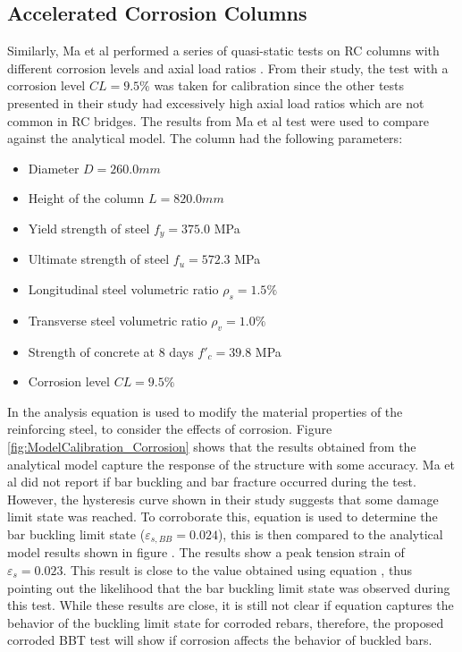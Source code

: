 \subsection{Accelerated Corrosion Columns}
Similarly, Ma et al performed a series of quasi-static tests on RC columns with different corrosion levels and axial load ratios \cite{Ma2012}. From their study, the test with a corrosion level $CL=9.5\%$ was taken for calibration since the other tests presented in their study had excessively high axial load ratios which are not common in RC bridges. The results from Ma et al test	\cite{Ma2012} were used to compare against the analytical model. The column had the following parameters:
\begin{itemize}
	\item Diameter $D = 260.0 mm$
	\item Height of the column $L = 820.0 mm$
	\item Yield strength of steel $f_{y} = 375.0$ MPa
	\item Ultimate strength of steel $f_{u} = 572.3$ MPa
	\item Longitudinal steel volumetric ratio $\rho_{s} = 1.5\% $
	\item Transverse steel volumetric ratio $\rho_{v} = 1.0\% $
	\item Strength of concrete at 8 days $f'_{c} = 39.8$ MPa
	\item Corrosion level $CL=9.5\%$
\end{itemize}

In the analysis equation  is used to modify the material properties of the reinforcing steel, to consider the effects of corrosion. Figure \ref{fig:ModelCalibration_Corrosion} shows that the results obtained from the analytical model capture the response of the structure with some accuracy. Ma et al \cite{Ma2012} did not report if bar buckling and bar fracture occurred during the test. However, the hysteresis curve shown in their study suggests that some damage limit state was reached. To corroborate this, equation  is used to determine the bar buckling limit state ($\varepsilon_{s,BB}=0.024$), this is then compared to the analytical model results shown in figure . The results show a peak tension strain of $\varepsilon_{s}=0.023$. This result is close to the value obtained using equation , thus pointing out the likelihood that the bar buckling limit state was observed during this test. While these results are close, it is still not clear if equation  captures the behavior of the buckling limit state for corroded rebars, therefore, the proposed corroded BBT test will show if corrosion affects the behavior of buckled bars.

